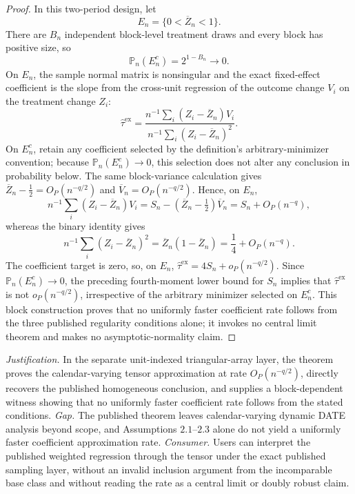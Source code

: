 \documentclass{article}
\begin{document}
\begin{proof}
In this two-period design, let
\[
E_n=\{0<\overline Z_n<1\}.
\]
There are \(B_n\) independent block-level treatment draws and every block has positive size, so
\[
\mathbb P_n(E_n^c)=2^{1-B_n}\longrightarrow0.
\]
On \(E_n\), the sample normal matrix is nonsingular and the exact fixed-effect coefficient is the slope from the cross-unit regression of the outcome change \(V_i\) on the treatment change \(Z_i\):
\[
\widehat\tau^{\mathrm{ex}}
=\frac{n^{-1}\sum_i(Z_i-\overline Z_n)V_i}
       {n^{-1}\sum_i(Z_i-\overline Z_n)^2}.
\]
On \(E_n^c\), retain any coefficient selected by the definition's arbitrary-minimizer convention; because \(\mathbb P_n(E_n^c)\to0\), this selection does not alter any conclusion in probability below. The same block-variance calculation gives
\(\overline Z_n-\tfrac12=O_P(n^{-q/2})\) and
\(\overline V_n=O_P(n^{-q/2})\). Hence, on \(E_n\),
\[
n^{-1}\sum_i(Z_i-\overline Z_n)V_i
=S_n-(\overline Z_n-\tfrac12)\overline V_n
=S_n+O_P(n^{-q}),
\]
whereas the binary identity gives
\[
n^{-1}\sum_i(Z_i-\overline Z_n)^2
=\overline Z_n(1-\overline Z_n)
=\frac14+O_P(n^{-q}).
\]
The coefficient target is zero, so, on \(E_n\),
\(\widehat\tau^{\mathrm{ex}}=4S_n+o_P(n^{-q/2})\). Since \(\mathbb P_n(E_n^c)\to0\), the preceding fourth-moment lower bound for \(S_n\) implies that \(\widehat\tau^{\mathrm{ex}}\) is not \(o_P(n^{-q/2})\), irrespective of the arbitrary minimizer selected on \(E_n^c\). This block construction proves that no uniformly faster coefficient rate follows from the three published regularity conditions alone; it invokes no central limit theorem and makes no asymptotic-normality claim.
\end{proof}
\par\smallskip\noindent \textit{Justification.} In the separate unit-indexed triangular-array layer, the theorem proves the calendar-varying tensor approximation at rate \(O_P(n^{-q/2})\), directly recovers the published homogeneous conclusion, and supplies a block-dependent witness showing that no uniformly faster coefficient rate follows from the stated conditions. \textit{Gap.} The published theorem leaves calendar-varying dynamic DATE analysis beyond scope, and Assumptions \(2.1\)--\(2.3\) alone do not yield a uniformly faster coefficient approximation rate. \textit{Consumer.} Users can interpret the published weighted regression through the tensor under the exact published sampling layer, without an invalid inclusion argument from the incomparable base class and without reading the rate as a central limit or doubly robust claim.
\end{document}

